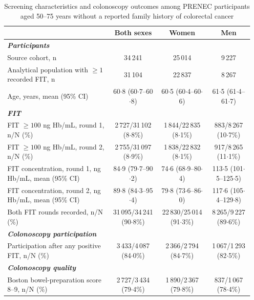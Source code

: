 \documentclass[10pt,a4paper]{article}
\renewcommand{\arraystretch}{1.12}
\newcommand{\dec}{\ensuremath{\cdot}}
\begin{document}
\begin{table}[p]
\centering
\caption{Screening characteristics and colonoscopy outcomes among PRENEC
participants aged 50--75 years without a reported family history of
colorectal cancer}
\label{tab:screening}
\begin{threeparttable}
\scriptsize
\setlength{\tabcolsep}{3pt}
\renewcommand{\arraystretch}{1.04}
\begin{tabularx}{\linewidth}{@{}>{\raggedright\arraybackslash}X C C C@{}}
\toprule
 & \textbf{Both sexes} & \textbf{Women} & \textbf{Men}\\
\midrule
\textit{\textbf{Participants}} & & &\\
Source cohort, n & 34\,241 & 25\,014 & 9\,227\\
Analytical population with $\geq1$ recorded FIT, n &
31\,104 & 22\,837 & 8\,267\\
Age, years, mean (95\% CI) & 60\dec{}8 (60\dec{}7--60\dec{}8) &
60\dec{}5 (60\dec{}4--60\dec{}6) &
61\dec{}5 (61\dec{}4--61\dec{}7)\\
\addlinespace
\textit{\textbf{FIT}} & & &\\
FIT $\geq100$ ng Hb/mL, round 1, n/N (\%) &
2\,727/31\,102 (8\dec{}8\%) &
1\,844/22\,835 (8\dec{}1\%) &
883/8\,267 (10\dec{}7\%)\\
FIT $\geq100$ ng Hb/mL, round 2, n/N (\%) &
2\,755/31\,097 (8\dec{}9\%) &
1\,838/22\,832 (8\dec{}1\%) &
917/8\,265 (11\dec{}1\%)\\
FIT concentration, round 1, ng Hb/mL, mean (95\% CI) &
84\dec{}9 (79\dec{}7--90\dec{}2) &
74\dec{}6 (68\dec{}9--80\dec{}4) &
113\dec{}5 (101\dec{}5--125\dec{}5)\\
FIT concentration, round 2, ng Hb/mL, mean (95\% CI) &
89\dec{}8 (84\dec{}3--95\dec{}4) &
79\dec{}8 (73\dec{}6--86\dec{}0) &
117\dec{}6 (105\dec{}4--129\dec{}8)\\
Both FIT rounds recorded, n/N (\%) &
31\,095/34\,241 (90\dec{}8\%) &
22\,830/25\,014 (91\dec{}3\%) &
8\,265/9\,227 (89\dec{}6\%)\\
\addlinespace
\textit{\textbf{Colonoscopy participation}} & & &\\
Participation after any positive FIT, n/N (\%) &
3\,433/4\,087 (84\dec{}0\%) &
2\,366/2\,794 (84\dec{}7\%) &
1\,067/1\,293 (82\dec{}5\%)\\
\addlinespace
\textit{\textbf{Colonoscopy quality}} & & &\\
Boston bowel-preparation score 8--9, n/N (\%) &
2\,727/3\,434 (79\dec{}4\%) &
1\,890/2\,367 (79\dec{}8\%) &
837/1\,067 (78\dec{}4\%)\\

\end{tabularx}
\end{threeparttable}
\end{table}
\end{document}
